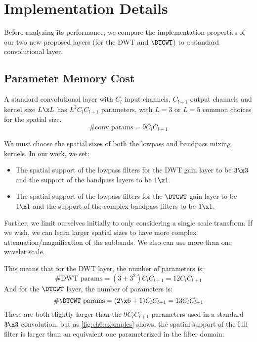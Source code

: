 \section{Implementation Details}

Before analyzing its performance, we compare the implementation properties of
our two new proposed layers (for the DWT and $\DTCWT$) to a standard
convolutional layer.

\subsection{Parameter Memory Cost}\label{sec:ch6:memory}
A standard convolutional layer with $C_l$ input channels, $C_{l+1}$ output channels
and kernel size $L\x L$ has $L^2C_{l}C_{l+1}$ parameters, with $L=3$ or $L=5$
common choices for the spatial size.
\begin{equation}
  \text{\#conv params} = 9C_lC_{l+1}
\end{equation}

We must choose the spatial sizes of both the lowpass and bandpass
mixing kernels. In our work, we set:
%
\begin{itemize}
  \item The spatial support of the lowpass filters for the DWT gain 
    layer to be $3\x 3$ and the support of the bandpass layers to be $1\x 1$.
  \item The spatial support of the lowpass filters for the $\DTCWT$ gain layer to
    be $1\x 1$ and the support of the complex bandpass filters to be $1\x 1$.
\end{itemize}
%
Further, we limit ourselves initially to only considering a single scale
transform.  If we wish, we can learn larger spatial sizes to have more complex
attenuation/magnification of the subbands. We also can use more than one wavelet
scale. 

This means that for the DWT layer, the number of parameters is:
%
\begin{equation}
  \text{\#DWT params} = (3 + 3^2)C_lC_{l+1} = 12C_lC_{l+1} \label{eq:ch6:memcost1}
\end{equation} 
%
And for the $\DTCWT$ layer, the number of parameters is:
\begin{equation}
  \text{\#$\DTCWT$ params} = (2\x 6 + 1)C_lC_{l+1} = 13C_lC_{l+1} \label{eq:ch6:memcost2}
\end{equation} 
%
These are both slightly larger than the $9C_lC_{l+1}$ parameters used in a
standard $3\x 3$ convolution, but as \autoref{fig:ch6:examples} shows, the
spatial support of the full filter is larger than an equivalent one
parameterized in the filter domain. 

